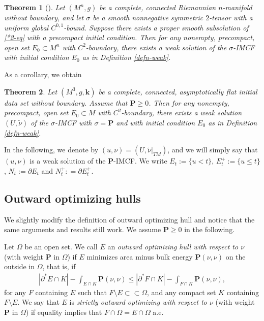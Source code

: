 \documentclass[11pt,letterpaper]{amsart}
\newtheorem{thm}{Theorem}[section]
\theoremstyle{definition}
\theoremstyle{remark}
\newcommand{\Pten}{\mathbf P}
\newcommand{\kten}{\mathbf k}
\begin{document}
\begin{thm}[{\cite[Theorem 4.9]{Dong26SigmaIMCF}}]\label{sgm-IMCF-existence}
	Let $(M^n, g)$ be a complete, connected Riemannian $n$-manifold without boundary, and let $\sigma $ be a smooth nonnegative symmetric $2$-tensor with a uniform global $C^{0,1}$-bound. Suppose there exists a proper smooth subsolution of \ref{*2-eq} with a precompact initial condition. Then for any nonempty, precompact, open set $E_0 \subset M^n$ with $C^2$-boundary, there exists a weak solution of the $\sigma $-IMCF with initial condition $E_0$ as in Definition \ref{defn-weak}.
\end{thm}
As a corollary, we obtain
\begin{thm}\label{P-IMCF-existence}
	Let $(M^3, g, \kten)$ be a complete, connected, asymptotically flat initial data set without boundary. Assume that $\Pten \geq 0$. Then for any nonempty, precompact, open set $E_0 \subset M$ with $C^2$-boundary, there exists a weak solution $(U, \tilde{\nu })$ of the $\sigma$-IMCF with $\sigma = \Pten$ and with initial condition $E_0$ as in Definition \ref{defn-weak}.
\end{thm}
In the following, we denote by $(u, \nu )= (U, \tilde{\nu }|_{TM})$, and we will simply say that $(u, \nu )$ is a weak solution of the $\Pten$-IMCF. We write $E_t:= \{ u< t\} $, $E_{t}^{+}:= \{ u \leq t\} $, $N_t := \partial E_t$ and $N_t ^{+}: = \partial E_t ^{+}$.

\subsection{Outward optimizing hulls}
We slightly modify the definition of outward optimizing hull and notice that the same arguments and results still work. We assume $\Pten \geq 0$ in the following.

Let $\Omega $ be an open set. We call $E$ an \textit{outward optimizing hull with respect to $\nu $} (with weight $\Pten $ in $\Omega $) if $E$ minimizes area minus bulk energy $\Pten (\nu ,\nu )$ on the outside in $\Omega $, that is, if
\begin{align}\label{defn-optimizing-hull}
	|\partial ^* E \cap K| - \int_{E \cap K} \Pten (\nu ,\nu ) \leq |\partial ^* F \cap K| - \int_{F \cap K} \Pten (\nu ,\nu ),
\end{align}
for any $F$ containing $E$ such that $F \setminus E \subset \subset \Omega $, and any compact set $K$ containing $F \setminus E$. We say that $E$ is \textit{strictly outward optimizing with respect to $\nu $} (with weight $\Pten$ in $\Omega $) if equality implies that $F \cap \Omega = E \cap \Omega $ a.e. 
\end{document}

